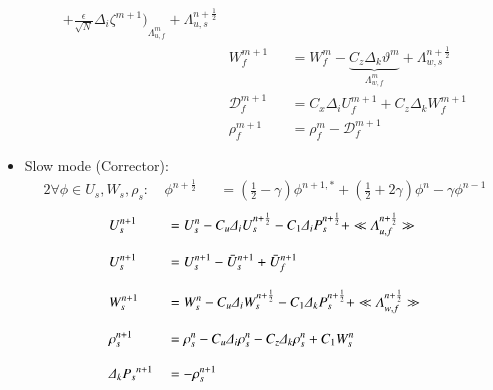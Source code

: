 \documentclass[a4paper,11pt]{article}
\begin{document}
\begin{itemize}[label=\textbullet,font=\tiny]
\begin{equation}
\begin{split}
{          +\frac{\epsilon}{\sqrt{N}} \Delta_i\zeta^{m+1} \big)}
         _{\Lambda_{u,f}^m}
    +\Lambda_{u,s}^{n+\frac{1}{2}} \\[3mm]
    &W_f^{m+1} &&=W_f^{m}
    -\underbrace{C_z\Delta_k\vartheta^{m}}_{\Lambda_{w,f}^m}
    +\Lambda_{w,s}^{n+\frac{1}{2}}\\[3mm]
    &\mathcal{D}_f^{m+1} &&=
    C_x\Delta_i{U_f^{m+1}}+C_z\Delta_k{W_f^{m+1}}\\[3mm]
    &\rho_f^{m+1} &&= \rho_f^{m}-\mathcal{D}_f^{m+1}   
   \end{split}
\end{equation}
   
\item Slow mode (Corrector):
   \begin{alignat}{2}
   \displaystyle
    \nonumber\forall\phi\in{U_s,W_s,\rho_s}:\ 
    &\phi^{n+\frac{1}{2}} &&=(\frac{1}{2}-\gamma)\phi^{n+1,*}
    +(\frac{1}{2}+2\gamma)\phi^{n}-\gamma\phi^{n-1}
   \end{alignat}
   \begin{equation}
   \begin{split}
   \displaystyle
    &U_s^{n+1} &&=U_s^{n}
    -C_u\Delta_i{U_s^{n+\frac{1}{2}}}
    -C_1\Delta_i{P_s^{n+\frac{1}{2}}}
    +\ll\Lambda_{u,f}^{n+\frac{1}{2}}\gg\\[3mm]
    &U_s^{n+1}&&=U_s^{n+1}-\bar{U}_s^{n+1}+\bar{U}_f^{n+1}\\[3mm]
    &W_s^{n+1} &&=W_s^{n}
    -C_u\Delta_i{W_s^{n+\frac{1}{2}}}
    -C_1\Delta_k{P_s^{n+\frac{1}{2}}}
    +\ll\Lambda_{w,f}^{n+\frac{1}{2}}\gg\\[3mm]
    &\rho_s^{n+1} &&=\rho_s^{n}
    -C_u\Delta_i{\rho_s^{n}}-C_z\Delta_k{\rho_s^{n}}
    +C_1 W_s^{n}\\[3mm]
    &\Delta_k{P_s}^{n+1} &&=-\rho_s^{n+1}
   \end{split}
   \end{equation}
   

\end{itemize}
\end{document}
